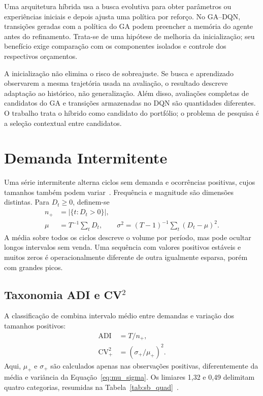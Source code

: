 Uma arquitetura híbrida usa a busca evolutiva para obter parâmetros ou experiências iniciais e depois ajusta uma política por reforço. No GA--DQN, transições geradas com a política do GA podem preencher a memória do agente antes do refinamento. Trata-se de uma hipótese de melhoria da inicialização; seu benefício exige comparação com os componentes isolados e controle dos respectivos orçamentos.



A inicialização não elimina o risco de sobreajuste. Se busca e aprendizado observarem a mesma trajetória usada na avaliação, o resultado descreve adaptação ao histórico, não generalização. Além disso, avaliações completas de candidatos do GA e transições armazenadas no DQN são quantidades diferentes. O trabalho trata o híbrido como candidato do portfólio; o problema de pesquisa é a seleção contextual entre candidatos.

\section{Demanda Intermitente}

Uma série intermitente alterna ciclos sem demanda e ocorrências positivas, cujos tamanhos também podem variar~\citep{Croston1972ForecastingIntermittentDemand,Boylan2008Intermittent}. Frequência e magnitude são dimensões distintas. Para $D_t\geq0$, definem-se
\begin{align}
n_+&=|\{t:D_t>0\}|,\label{eq:n_pos}\\
\mu&=T^{-1}\sum_tD_t,\qquad \sigma^2=(T-1)^{-1}\sum_t(D_t-\mu)^2.\label{eq:mu_sigma}
\end{align}
A média sobre todos os ciclos descreve o volume por período, mas pode ocultar longos intervalos sem venda. Uma sequência com valores positivos estáveis e muitos zeros é operacionalmente diferente de outra igualmente esparsa, porém com grandes picos.

\subsection[Taxonomia ADI e CV quadrado]{Taxonomia ADI e CV$^2$}
\label{sec:sb_taxa}

A classificação de \citet{Syntetos2005Categorization} combina intervalo médio entre demandas e variação dos tamanhos positivos:
\begin{align}
\mathrm{ADI}&=T/n_+,\label{eq:adi}\\
\mathrm{CV}_+^2&=(\sigma_+/\mu_+)^2.\label{eq:cv2}
\end{align}
Aqui, $\mu_+$ e $\sigma_+$ são calculados apenas nas observações positivas, diferentemente da média e variância da Equação~\ref{eq:mu_sigma}. Os limiares 1,32 e 0,49 delimitam quatro categorias, resumidas na Tabela~\ref{tab:sb_quad}~\citep{Syntetos2009InventoryForecastingReview}.

